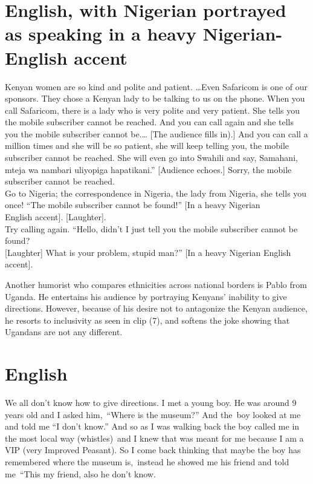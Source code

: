 \documentclass[output=paper]{langsci/langscibook}
\begin{document}
\chapter{English, with Nigerian portrayed as speaking in a heavy Nigerian-English accent}
\gll Kenyan women are so kind and polite and patient. …Even Safaricom is one of our sponsors. They chose a Kenyan lady to be talking to us on the phone. When you call Safaricom, there is a lady who is very polite and very patient. She tells you the mobile subscriber cannot be reached. And you can call again and she tells you the mobile subscriber cannot be.… \textup{[The audience fills in).]} And you can call a million times and she will be so patient, she will keep telling you, the mobile subscriber cannot be reached. She will even go into Swahili and say, Samahani, mteja wa nambari uliyopiga hapatikani.” \textup{[Audience echoes.]} Sorry, the mobile subscriber cannot be reached.\\
Go to Nigeria; the correspondence in Nigeria, the lady from Nigeria, she tells you \\
once! “The mobile subscriber cannot be found!”\textup{ [In a heavy Nigerian \\
English accent]. [Laughter].}\\
Try calling again. “Hello, didn’t I just tell you the mobile subscriber cannot be found? \\
\textup{[Laughter] }What is your problem, stupid man?” \textup{[In a heavy Nigerian English accent].}\\
\glt  \citep{Omogi2012b}
\z

  Another humorist who compares ethnicities across national borders is Pablo from Uganda. He entertains his audience by portraying Kenyans’ inability to give directions. However, because of his desire not to antagonize the Kenyan audience, he resorts to inclusivity as seen in clip (7), and softens the joke showing that Ugandans are not any different.

\chapter{English}
\gll We all don’t know how to give directions. I met a young boy. He was around 9 years old and I asked him,~“Where is the museum?” And the~boy looked at me and told me “I don’t know.” And so as I was walking back the boy called me in the most local way \textup{(whistles)}~and I knew that was meant for me because I am a VIP (very Improved Peasant). So I come back thinking that maybe the boy has remembered where the museum is,~instead he showed me his friend and told me~“This my friend, also he don’t know. \\
\glt \citep{Omogi2012c}
\z
\end{document}
